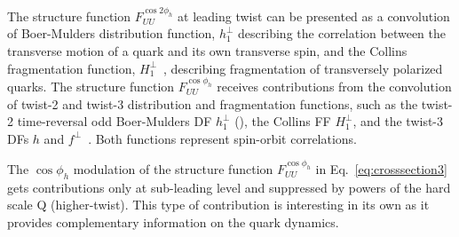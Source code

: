 \documentclass[aps,prl,twocolumn,showpacs,superscriptaddress,groupedaddress]{revtex4-1}  %
\newcommand{\ph}{\phi_h}
\begin{document}
The structure function $F^{\cos 2\ph}_{UU}$ at leading twist can be presented as a convolution of Boer-Mulders distribution function, $h_1^\perp$ \cite{Boer:1997nt} describing the correlation between the transverse motion
of a quark and its own transverse spin, and  the Collins fragmentation function, $H_1^{\perp}$~\cite{Collins:1992kk}, describing fragmentation of transversely polarized quarks.
The structure function $F^{\cos \ph}_{UU}$  receives contributions 
from the convolution of twist-2 and twist-3 distribution and fragmentation functions,
such as the twist-2 time-reversal odd Boer-Mulders DF $h_1^\perp$ (\cite{Boer:1997nt,Pasquini:2010af}), the Collins FF $H_1^{\perp}$, and the twist-3 DFs $h$ and $f^\perp$~\cite{Bacchetta:2006tn}.
Both functions represent spin-orbit correlations. 

The $\cos \phi_h$ modulation of the structure function $F_{UU}^{\cos \phi_h}$ in Eq.~\ref{eq:crosssection3} gets contributions only
at sub-leading level and suppressed by powers of the hard scale Q (higher-twist).
This type of contribution is interesting in its own as it provides complementary information
on the quark dynamics.
\end{document}

